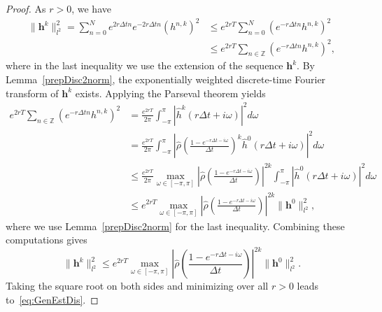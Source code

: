 \documentclass[reqno]{amsart}
\begin{document}
\begin{proof}
As $r>0$, we have
\begin{align*}
	\|\boldsymbol{h}^k\|_{l^2}^2  = \sum_{n=0}^{N} e^{2 r \Delta t n}e^{-2 r \Delta t n} \left(h^{n,k}\right)^2 
	&\leq e^{2 rT} \sum_{n=0}^{N}  \left(e^{-r \Delta t n}h^{n,k}\right)^2 \\
	&\leq e^{2 rT} \sum_{n\in\mathbb{Z}} \left( e^{- r \Delta t n}h^{n,k}\right)^2,
\end{align*}
where in the last inequality we use the extension of the sequence $\boldsymbol{h}^k$. By Lemma~\ref{prepDisc2norm}, the exponentially weighted discrete-time Fourier transform of $\boldsymbol{h}^k$ exists. Applying the Parseval theorem yields 
\[\begin{aligned}
e^{2rT} \sum_{n\in\mathbb{Z}} \left( e^{- r \Delta t n}h^{n,k}\right)^2 
&= \frac{e^{2rT}}{2 \pi} \int_{-\pi}^{\pi} \left| \widehat{h}^{k}(r \Delta t + i \omega) \right|^2 d \omega \\
&= \frac{e^{2rT}}{2 \pi} \int_{-\pi}^{\pi} \left| \hat{\rho}\left(\frac{1-e^{-r \Delta t -i \omega}}{\Delta t}\right)^k \widehat{h}^{0}(r \Delta t + i \omega) \right|^2 d \omega \\
&\leq \frac{e^{2rT}}{2 \pi} \max_{\omega \in [-\pi,\pi]} \left|\hat{\rho}\left(\frac{1-e^{-r \Delta t -i \omega}}{\Delta t}\right)\right|^{2k}\int_{-\pi}^{\pi} \left| \widehat{h}^{0}(r \Delta t + i \omega) \right|^2  d \omega\\
&\leq e^{2rT} \max_{\omega \in [-\pi,\pi]} \left|\hat{\rho}\left(\frac{1-e^{-r \Delta t -i \omega}}{\Delta t}\right)\right|^{2k} \|\boldsymbol{h}^0\|_{l^2}^2,
\end{aligned}\]
where we use Lemma~\ref{prepDisc2norm} for the last inequality. Combining these computations gives
\[\|\boldsymbol{h}^k\|_{l^2}^2 \leq e^{2rT} \max_{\omega \in [-\pi,\pi]} \left|\hat{\rho}\left(\frac{1-e^{-r \Delta t -i \omega}}{\Delta t}\right)\right|^{2k} \|\boldsymbol{h}^0\|_{l^2}^2.\]
Taking the square root on both sides and minimizing over all $r > 0$ leads to~\eqref{eq:GenEstDis}.
\end{proof}
\end{document}
